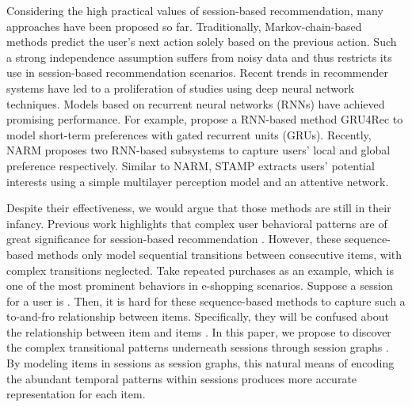 \documentclass[sigconf]{acmart}
\begin{document}
Considering the high practical values of session-based recommendation, many approaches have been proposed so far. Traditionally, Markov-chain-based methods \cite{Rendle:2010is} predict the user's next action solely based on the previous action. Such a strong independence assumption suffers from noisy data and thus restricts its use in session-based recommendation scenarios. Recent trends in recommender systems have led to a proliferation of studies using deep neural network techniques. Models based on recurrent neural networks (RNNs) have achieved promising performance. For example, \citeauthor{Hidasi:2016uq} propose a RNN-based method GRU4Rec \cite{Hidasi:2016uq} to model short-term preferences with gated recurrent units (GRUs). Recently, NARM \cite{Li:2017hk} proposes two RNN-based subsystems to capture users' local and global preference respectively. Similar to NARM, STAMP \cite{Liu:2018er} extracts users' potential interests using a simple multilayer perception model and an attentive network.

Despite their effectiveness, we would argue that those methods are still in their infancy. Previous work highlights that complex user behavioral patterns are of great significance for session-based recommendation \cite{Li:2017hk,Liu:2018er}. However, these sequence-based methods only model sequential transitions between consecutive items, with complex transitions neglected. Take  repeated purchases as an example, which is one of the most prominent behaviors in e-shopping scenarios. Suppose a session for a user is . Then, it is hard for these sequence-based methods to capture such a to-and-fro relationship between items. Specifically, they will be confused about the relationship between item  and items . In this paper, we propose to discover the complex transitional patterns underneath sessions through session graphs \cite{Wu:2019ke}. By modeling items in sessions as session graphs, this natural means of encoding the abundant temporal patterns within sessions produces more accurate representation for each item.
\end{document}
